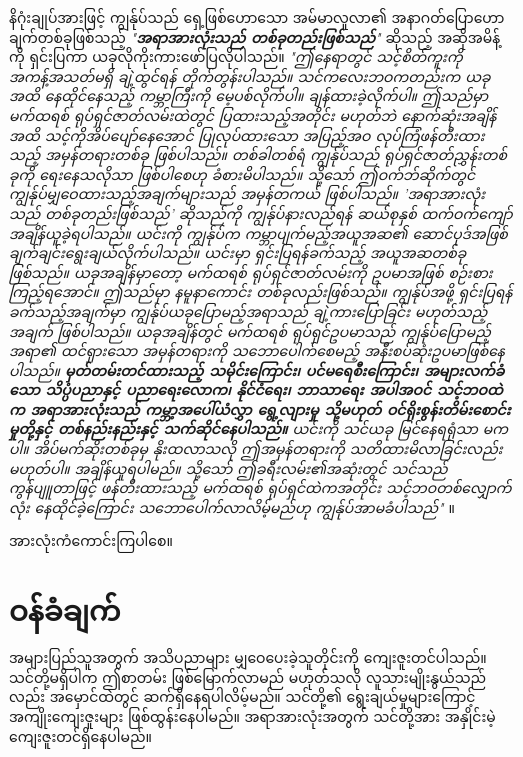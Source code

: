 \documentclass[10pt,twocolumn,letterpaper]{article}
\renewcommand{\refname}{ကိုးကားချက်များ}
\begin{document}
နိဂုံးချုပ်အားဖြင့် ကျွန်ုပ်သည် ရှေ့ဖြစ်ဟောသော အမ်မာလူလာ၏ အနာဂတ်ပြောဟောချက်တစ်ခုဖြစ်သည့် \textit{"\textbf{အရာအားလုံးသည် တစ်ခုတည်းဖြစ်သည်}"} ဆိုသည့် အဆိုအမိန့်ကို ရှင်းပြကာ ယခုလိုကိုးကားဖော်ပြလိုပါသည်။ \textit{"ဤနေရာတွင် သင့်စိတ်ကူးကို အကန့်အသတ်မရှိ ချဲ့ထွင်ရန် တိုက်တွန်းပါသည်။ သင်ကလေးဘဝကတည်းက ယခုအထိ နေထိုင်နေသည့် ကမ္ဘာကြီးကို မေ့ပစ်လိုက်ပါ။ ချန်ထားခဲ့လိုက်ပါ။ ဤသည်မှာ မက်ထရစ် ရုပ်ရှင်ဇာတ်လမ်းထဲတွင် ပြထားသည့်အတိုင်း မဟုတ်ဘဲ နောက်ဆုံးအချိန်အထိ သင့်ကိုအိပ်ပျော်နေအောင် ပြုလုပ်ထားသော အပြည့်အဝ လုပ်ကြံဖန်တီးထားသည့် အမှန်တရားတစ်ခု ဖြစ်ပါသည်။ တစ်ခါတစ်ရံ ကျွန်ုပ်သည် ရုပ်ရှင်ဇာတ်ညွှန်းတစ်ခုကို ရေးနေသလိုသာ ဖြစ်ပါစေဟု ခံစားမိပါသည်။ သို့သော် ဤဝက်ဘ်ဆိုက်တွင် ကျွန်ုပ်မျှဝေထားသည့်အချက်များသည် အမှန်တကယ် ဖြစ်ပါသည်။ 'အရာအားလုံးသည် တစ်ခုတည်းဖြစ်သည်' ဆိုသည်ကို ကျွန်ုပ်နားလည်ရန် ဆယ်စုနှစ် ထက်ဝက်ကျော် အချိန်ယူခဲ့ရပါသည်။ ယင်းကို ကျွန်ုပ်က ကမ္ဘာပျက်မည့်အယူအဆ၏ ဆောင်ပုဒ်အဖြစ် ချက်ချင်းရွေးချယ်လိုက်ပါသည်။ ယင်းမှာ ရှင်းပြရန်ခက်သည့် အယူအဆတစ်ခုဖြစ်သည်။ ယခုအချိန်မှာတော့ မက်ထရစ် ရုပ်ရှင်ဇာတ်လမ်းကို ဥပမာအဖြစ် စဉ်းစားကြည့်ရအောင်။ ဤသည်မှာ နမူနာကောင်း တစ်ခုလည်းဖြစ်သည်။ ကျွန်ုပ်အဖို့ ရှင်းပြရန်ခက်သည့်အချက်မှာ ကျွန်ုပ်ယခုပြောမည့်အရာသည် ချဲ့ကားပြောခြင်း မဟုတ်သည့်အချက် ဖြစ်ပါသည်။ ယခုအချိန်တွင် မက်ထရစ် ရုပ်ရှင်ဥပမာသည် ကျွန်ုပ်ပြောမည့်အရာ၏ ထင်ရှားသော အမှန်တရားကို သဘောပေါက်စေမည့် အနီးစပ်ဆုံးဥပမာဖြစ်နေပါသည်။ \textbf{မှတ်တမ်းတင်ထားသည့် သမိုင်းကြောင်း၊ ပင်မရေစီးကြောင်း၊ အများလက်ခံသော သိပ္ပံပညာနှင့်  ပညာရေးလောက၊ နိုင်ငံရေး၊ ဘာသာရေး အပါအဝင် သင့်ဘဝထဲက အရာအားလုံးသည် ကမ္ဘာ့အပေါ်ယံလွှာ ရွေ့လျားမှု သို့မဟုတ် ဝင်ရိုးစွန်းတိမ်းစောင်းမှုတို့နှင့် တစ်နည်းနည်းနှင့် သက်ဆိုင်နေပါသည်။} ယင်းကို သင်ယခု မြင်နေရရုံသာ မကပါ။ အိပ်မက်ဆိုးတစ်ခုမှ နိုးထလာသလို ဤအမှန်တရားကို သတိထားမိလာခြင်းလည်း မဟုတ်ပါ။ အချိန်ယူရပါမည်။ သို့သော် ဤခရီးလမ်း၏အဆုံးတွင် သင်သည် ကွန်ပျူတာဖြင့် ဖန်တီးထားသည့် မက်ထရစ် ရုပ်ရှင်ထဲကအတိုင်း သင့်ဘဝတစ်လျှောက်လုံး နေထိုင်ခဲ့ကြောင်း သဘောပေါက်လာလိမ့်မည်ဟု ကျွန်ုပ်အာမခံပါသည်"} \cite{33,34}။

အားလုံးကံကောင်းကြပါစေ။

\section{ဝန်ခံချက်}

အများပြည်သူအတွက် အသိပညာများ မျှဝေပေးခဲ့သူတိုင်းကို ကျေးဇူးတင်ပါသည်။ သင်တို့မရှိပါက ဤစာတမ်း ဖြစ်မြောက်လာမည် မဟုတ်သလို လူသားမျိုးနွယ်သည်လည်း အမှောင်ထဲတွင် ဆက်ရှိနေရပါလိမ့်မည်။ သင်တို့၏ ရွေးချယ်မှုများကြောင့် အကျိုးကျေးဇူးများ ဖြစ်ထွန်းနေပါမည်။ အရာအားလုံးအတွက် သင်တို့အား အနှိုင်းမဲ့ ကျေးဇူးတင်ရှိနေပါမည်။

\clearpage
\twocolumn

{\small
\renewcommand{\refname}{ကိုးကားချက်များ}


}
\end{document}
